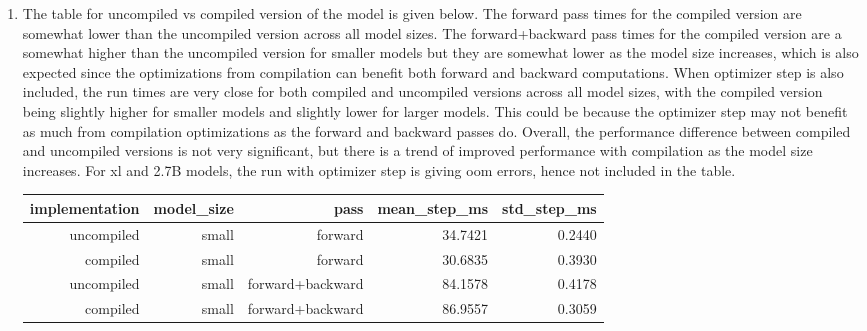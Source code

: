 \documentclass{article}
\begin{document}
\begin{enumerate}[start=1,label=\arabic*.]
\begin{enumerate}
\begin{enumerate}[label=\alph*.]
                    \begin{table}[h]
                        \centering
                    \end{table}
                \newpage
                \item The table for uncompiled vs compiled version of the model is given below. The forward pass times for the compiled version are somewhat lower than the uncompiled version across all model sizes. The forward+backward pass times for the compiled version are a somewhat higher than the uncompiled version for smaller models but they are somewhat lower as the model size increases, which is also expected since the optimizations from compilation can benefit both forward and backward computations. When optimizer step is also included, the run times are very close for both compiled and uncompiled versions across all model sizes, with the compiled version being slightly higher for smaller models and slightly lower for larger models. This could be because the optimizer step may not benefit as much from compilation optimizations as the forward and backward passes do. Overall, the performance difference between compiled and uncompiled versions is not very significant, but there is a trend of improved performance with compilation as the model size increases. For xl and 2.7B models, the run with optimizer step is giving oom errors, hence not included in the table.
                    \begin{table}[h]
                        \centering
                            \begin{tabular}{|r|r|r|r|r|}
                                \hline
                                implementation & model\_size & pass & mean\_step\_ms & std\_step\_ms \\
                                \hline
                                uncompiled & small & forward & 34.7421 & 0.2440 \\
                                \hline
                                compiled & small & forward & 30.6835 & 0.3930 \\
                                \hline
                                uncompiled & small & forward+backward & 84.1578 & 0.4178 \\
                                \hline
                                compiled & small & forward+backward & 86.9557 & 0.3059 \\

\end{tabular}
\end{table}
\end{enumerate}
\end{enumerate}
\end{enumerate}
\end{document}
